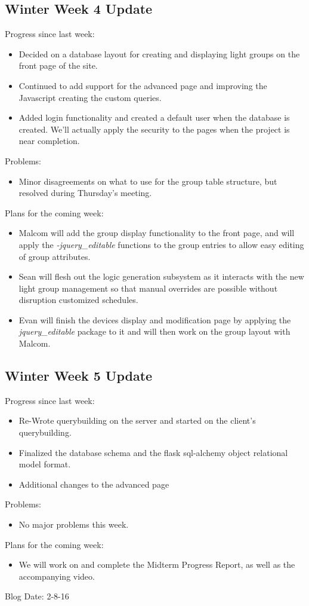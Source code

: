 \subsection{Winter Week 4 Update}
Progress since last week:
\begin{itemize}
   \item Decided on a database layout for creating and displaying light groups on the front page of the site.
   \item Continued to add support for the advanced page and improving the Javascript creating the custom queries.
   \item Added login functionality and created a default user when the database is created. We'll actually apply the security to the pages when the project is near completion.
\end{itemize}
Problems:
\begin{itemize}
   \item Minor disagreements on what to use for the group table structure, but resolved during Thursday's meeting.
\end{itemize}
Plans for the coming week:
\begin{itemize}
   \item Malcom will add the group display functionality to the front page, and will apply the \textit{-jquery\_editable} functions to the group entries to allow easy editing of group attributes.
   \item Sean will flesh out the logic generation subsystem as it interacts with the new light group management so that manual overrides are possible without disruption customized schedules.
   \item Evan will finish the devices display and modification page by applying the \textit{jquery\_editable} package to it and will then work on the group layout with Malcom.
\end{itemize}
\subsection{Winter Week 5 Update}
Progress since last week:
\begin{itemize}
   \item Re-Wrote querybuilding on the server and started on the client's querybuilding.
   \item Finalized the database schema and the flask sql-alchemy object relational model format.
   \item Additional changes to the advanced page
\end{itemize}
Problems:
\begin{itemize}
   \item No major problems this week.
\end{itemize}
Plans for the coming week:
\begin{itemize}
   \item We will work on and complete the Midterm Progress Report, as well as the accompanying video.
\end{itemize}
Blog Date: 2-8-16

